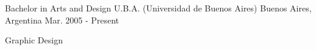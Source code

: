 

\begin{cventries}

  \cventry
    {Bachelor in Arts and Design} %
    {U.B.A. (Universidad de Buenos Aires)} %
    {Buenos Aires, Argentina} %
    {Mar. 2005 - Present} %
    {
      \begin{cvitems}
        Graphic Design
      \end{cvitems}
    }




\end{cventries}



